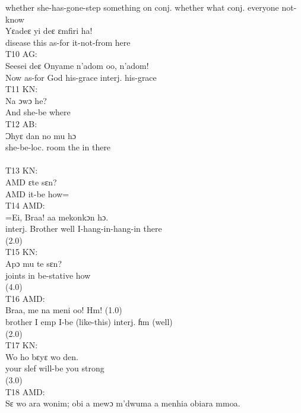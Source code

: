 \documentclass[output=paper,colorlinks,citecolor=brown]{langscibook}
\begin{document}
            whether she-has-gone-step something on conj. whether what conj. everyone not-know\\
    \ex
    \gll    Yɛadeɛ yi deɛ ɛmfiri ha! \\
            disease this as-for it-not-from here \\
    \z
\ex%
    T10 AG:\\
    \gll    Seesei deɛ Onyame n’adom oo, n’adom! \\
            Now as-for God his-grace interj. his-grace\\
\ex%
    T11 KN:\\
    \gll    Na ɔwɔ he?\\
            And she-be where\\
\ex%
    T12 AB:\\
    \gll    Ɔhyɛ dan no mu hɔ \\
            she-be-loc. room the in there\\
            [KN Enters AMD’s Room]\\
\ex%
    T13 KN:\\
    \gll    AMD ɛte sɛn?\\
            AMD it-be how=\\
\ex%
    T14 AMD:\\
    \gll    =Ei, Braa! aa mekonkɔn hɔ.\\
            interj. Brother well I-hang-in-hang-in there \\
            (2.0)\\
\ex%
    T15 KN:\\
    \gll    Apɔ mu te sɛn? \\
            joints in be-stative how\\
            (4.0)\\
\ex%
    T16 AMD:\\
    \gll    Braa, me na meni oo! Hm! (1.0)\\
            brother I emp I-be (like-this) interj. ɦm (well)\\
            (2.0)\\
\ex%
    T17 KN:\\
    \gll    Wo ho bɛyɛ wo den.\\
            your slef will-be you strong\\
            (3.0)\\
\ex%
    T18 AMD:\\
    \ea
    \gll    Sɛ wo ara wonim; obi a mewɔ m’dwuma a menhia obiara mmoa.\\
\end{document}

